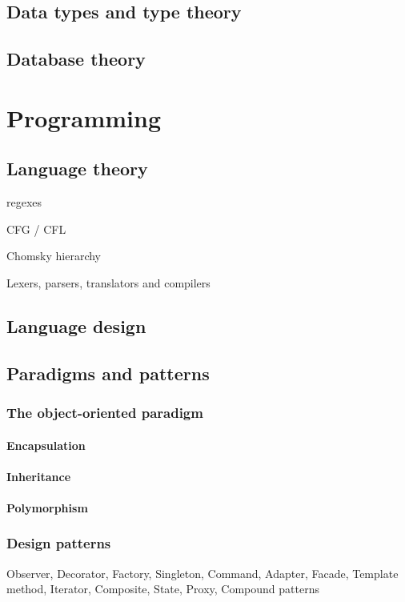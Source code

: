 \documentclass{report}
\begin{document}
\chapter{Data types and type theory}


\chapter{Database theory}

\part{Programming}
\setcounter{chapter}{0} %

\chapter{Language theory}

regexes

CFG / CFL

Chomsky hierarchy

Lexers, parsers, translators and compilers
\chapter{Language design}


\chapter{Paradigms and patterns}
\section{The object-oriented paradigm}
\subsection{Encapsulation}
\subsection{Inheritance}
\subsection{Polymorphism}

\section{Design patterns}
Observer, Decorator, Factory, Singleton, Command, Adapter, Facade, Template method, Iterator, Composite, State, Proxy, Compound patterns
\end{document}
